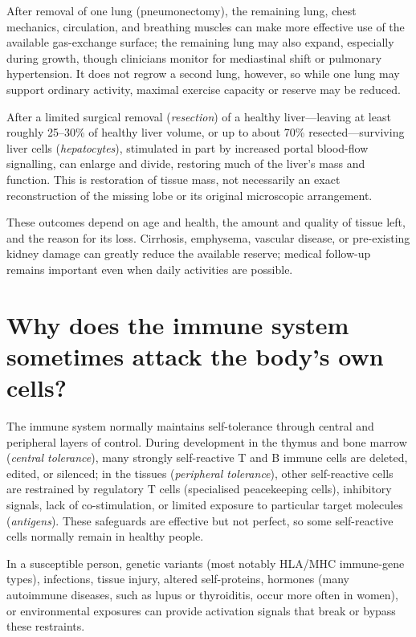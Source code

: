 \documentclass[11pt,oneside]{report}
\begin{document}
After removal of one lung (pneumonectomy), the remaining lung, chest mechanics,
circulation, and breathing muscles can make more effective use of the available
gas-exchange surface; the remaining lung may also expand, especially during
growth, though clinicians monitor for mediastinal shift or pulmonary
hypertension. It does not regrow a second lung, however, so while one lung may
support ordinary activity, maximal exercise capacity or reserve may be reduced.

After a limited surgical removal (\emph{resection}) of a healthy liver—leaving
at least roughly 25--30\% of healthy liver volume, or up to about 70\%
resected—surviving liver cells (\emph{hepatocytes}), stimulated in part by
increased portal blood-flow signalling, can enlarge and divide, restoring much
of the liver's mass and function. This is
restoration of tissue mass, not necessarily an exact reconstruction of the
missing lobe or its original microscopic arrangement.

These outcomes depend on age and health, the amount and quality of tissue left,
and the reason for its loss. Cirrhosis, emphysema, vascular disease, or
pre-existing kidney damage can greatly reduce the available reserve; medical
follow-up remains important even when daily activities are possible.

\section{Why does the immune system sometimes attack the body's own cells?}

The immune system normally maintains self-tolerance through central and
peripheral layers of control. During development in the thymus and bone marrow
(\emph{central tolerance}), many strongly self-reactive T and B immune cells
are deleted, edited, or silenced; in the tissues (\emph{peripheral tolerance}),
other self-reactive cells are restrained by regulatory T cells (specialised
peacekeeping cells), inhibitory signals, lack of co-stimulation, or limited
exposure to particular target molecules (\emph{antigens}). These safeguards are
effective but not perfect, so some self-reactive cells normally remain in
healthy people.

In a susceptible person, genetic variants (most notably HLA/MHC immune-gene
types), infections, tissue injury, altered self-proteins, hormones (many
autoimmune diseases, such as lupus or thyroiditis, occur more often in women),
or environmental exposures can provide activation signals that break or bypass
these restraints.
\end{document}
